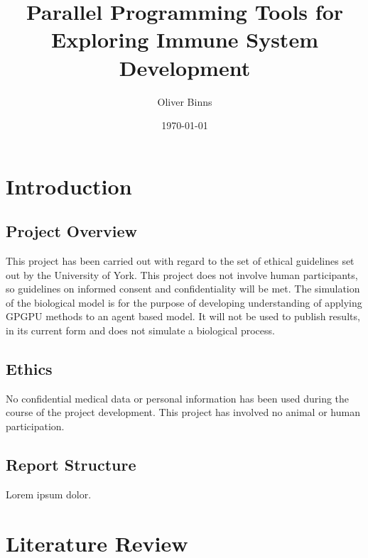 \documentclass{UoYCSproject}
\title{Parallel Programming Tools for Exploring Immune System Development}
\author{Oliver Binns}
\date{\today}
\begin{document}
\maketitle
\listoffigures
\listoftables

\chapter{Introduction}
\section{Project Overview} %
This project has been carried out with regard to the set of ethical guidelines set out by the University of York. This project does not involve human participants, so guidelines on informed consent and confidentiality will be met. The simulation of the biological model is for the purpose of developing understanding of applying GPGPU methods to an agent based model. It will not be used to publish results, in its current form and does not simulate a biological process.


\section{Ethics}
No confidential medical data or personal information has been used during the course of the project development.
This project has involved no animal or human participation.

\section{Report Structure}
Lorem ipsum dolor.

\chapter{Literature Review}
%
\end{document}
